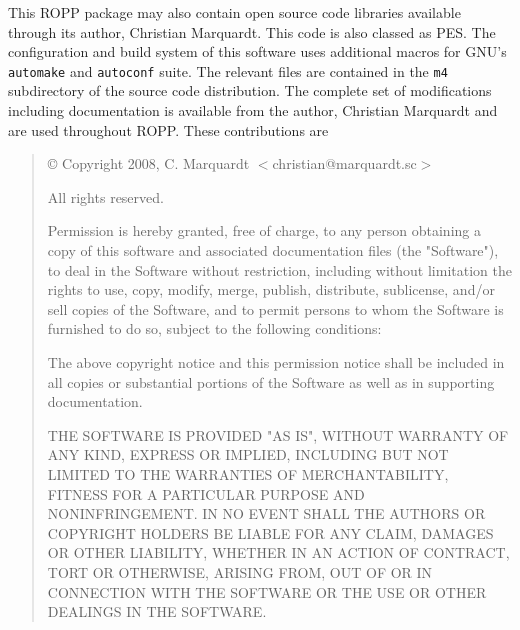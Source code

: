 This ROPP package may also contain open source code libraries available
through its author, Christian Marquardt. This code is also classed as PES.
The configuration and build system of this software uses additional
macros for GNU's \texttt{automake} and \texttt{autoconf} suite. The
relevant files are contained in the \texttt{m4} subdirectory of the
source code distribution. The complete set of modifications including
documentation is available from the author, Christian Marquardt
and are used throughout ROPP. These contributions are
%
\begin{quote}
   \copyright{} Copyright 2008, C. Marquardt $<$christian@marquardt.sc$>$

    All rights reserved.

    Permission is hereby granted, free of charge, to any person obtaining
    a copy of this software and associated documentation files (the
    "Software"), to deal in the Software without restriction, including
    without limitation the rights to use, copy, modify, merge, publish,
    distribute, sublicense, and/or sell copies of the Software, and to
    permit persons to whom the Software is furnished to do so, subject to
    the following conditions:

    The above copyright notice and this permission notice shall be
    included in all copies or substantial portions of the Software as well
    as in supporting documentation.

    THE SOFTWARE IS PROVIDED "AS IS", WITHOUT WARRANTY OF ANY KIND,
    EXPRESS OR IMPLIED, INCLUDING BUT NOT LIMITED TO THE WARRANTIES OF
    MERCHANTABILITY, FITNESS FOR A PARTICULAR PURPOSE AND
    NONINFRINGEMENT. IN NO EVENT SHALL THE AUTHORS OR COPYRIGHT HOLDERS BE
    LIABLE FOR ANY CLAIM, DAMAGES OR OTHER LIABILITY, WHETHER IN AN ACTION
    OF CONTRACT, TORT OR OTHERWISE, ARISING FROM, OUT OF OR IN CONNECTION
    WITH THE SOFTWARE OR THE USE OR OTHER DEALINGS IN THE SOFTWARE.
\end{quote}
%

